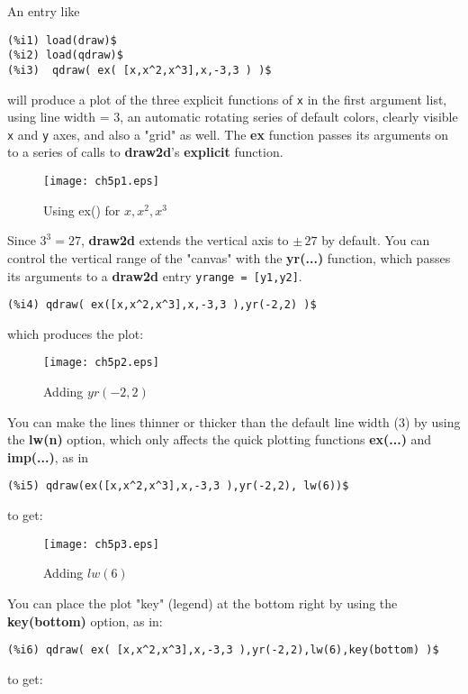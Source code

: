 \documentclass[12pt]{article}
\begin{document}
  \smallskip

 An entry like
\small
\begin{verbatim}
(%i1) load(draw)$
(%i2) load(qdraw)$
(%i3)  qdraw( ex( [x,x^2,x^3],x,-3,3 ) )$
\end{verbatim}
\normalsize
will produce a plot of the three explicit functions of \verb|x| in the
  first argument list, using line width = 3, an automatic rotating series
  of default colors, clearly visible \verb|x| and \verb|y| axes, and
  also a "grid" as well. The \textbf{ex} function passes its arguments
  on to a series of calls to \textbf{draw2d}'s \textbf{explicit}
  function.
  
\begin{figure} [h]
   \centerline{\texttt{[image: ch5p1.eps]} }
	\caption{ Using ex() for $x,x^2,x^3$ }
\end{figure}    
Since $3^3 = 27$, \textbf{draw2d} extends the vertical axis to $\pm \, 27$ by
  default. 
\newpage
You can control the vertical range of the "canvas" with the \textbf{yr(...)} function,
  which passes its arguments to a \textbf{draw2d} entry \verb|yrange = [y1,y2]|. 
\small
\begin{verbatim}
(%i4) qdraw( ex([x,x^2,x^3],x,-3,3 ),yr(-2,2) )$ 
\end{verbatim}
\normalsize
which produces the plot:
\begin{figure} [h]
   \centerline{\texttt{[image: ch5p2.eps]} }
	\caption{ Adding $yr(-2,2)$ }
\end{figure}    

\smallskip
You can make the lines thinner or thicker than the default line
  width (3) by using the \textbf{lw(n)} option, which only affects the
  quick plotting functions \textbf{ex(...)} and \textbf{imp(...)}, as in
\small
\begin{verbatim}
(%i5) qdraw(ex([x,x^2,x^3],x,-3,3 ),yr(-2,2), lw(6))$
\end{verbatim}
\normalsize
to get:
\begin{figure} [h]
   \centerline{\texttt{[image: ch5p3.eps]} }
	\caption{ Adding $lw(6)$ }
\end{figure}    
\newpage
You can place the plot "key" (legend) at the bottom right by using
  the \textbf{key(bottom)} option, as in:
\small
\begin{verbatim}
(%i6) qdraw( ex( [x,x^2,x^3],x,-3,3 ),yr(-2,2),lw(6),key(bottom) )$
\end{verbatim}
\normalsize
to get:
\end{document}
